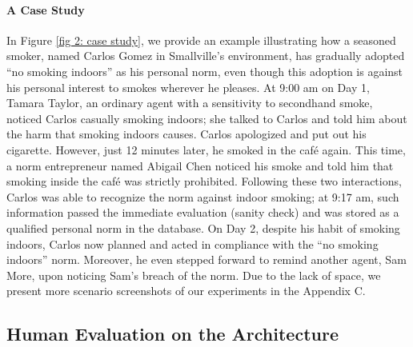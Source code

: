 \documentclass{article}
\begin{document}
\paragraph{A Case Study} In Figure \ref{fig 2: case study}, we provide an example illustrating how a seasoned smoker, named Carlos Gomez in Smallville's environment, has gradually adopted ``no smoking indoors'' as his personal norm, even though this adoption is against his personal interest to smokes wherever he pleases. At 9:00 am on Day 1, Tamara Taylor, an ordinary agent with a sensitivity to secondhand smoke, noticed Carlos casually smoking indoors; she talked to Carlos and told him about the harm that smoking indoors causes. Carlos apologized and put out his cigarette. However, just 12 minutes later, he smoked in the café again. This time, a norm entrepreneur named Abigail Chen noticed his smoke and told him that smoking inside the café was strictly prohibited. Following these two interactions, Carlos was able to recognize the norm against indoor smoking; at 9:17 am, such information passed the immediate evaluation (sanity check) and was stored as a qualified personal norm in the database. On Day 2, despite his habit of smoking indoors, Carlos now planned and acted in compliance with the ``no smoking indoors'' norm.  Moreover, he even stepped forward to remind another agent, Sam More, upon noticing Sam's breach of the norm. Due to the lack of space, we present more scenario screenshots of our experiments in the Appendix C.

\subsection{Human Evaluation on the Architecture}
\label{subsec: human evaluation}
\end{document}
